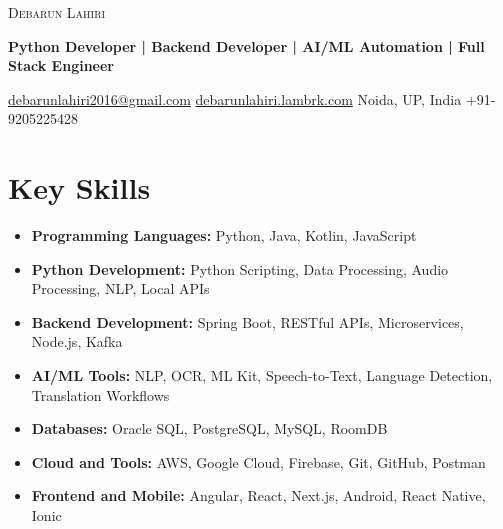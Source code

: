 \documentclass[10pt, a4paper]{article}
\begin{document}
\small

\begin{center}
    {\Huge \scshape Debarun Lahiri}
    \vspace{0.5ex}

    \textbf{Python Developer | Backend Developer | AI/ML Automation | Full Stack Engineer}
    \vspace{0.8ex}

    \href{mailto:debarunlahiri2016@gmail.com}{debarunlahiri2016@gmail.com} \quad\textbar\quad
    \href{https://debarunlahiri-web.vercel.app/}{debarunlahiri.lambrk.com} \quad\textbar\quad
    Noida, UP, India \quad\textbar\quad
    +91-9205225428
\end{center}

\section*{Key Skills}
\begin{itemize}[leftmargin=*, label={}, itemsep=0.2ex]
    \item \textbf{Programming Languages:} Python, Java, Kotlin, JavaScript
    \item \textbf{Python Development:} Python Scripting, Data Processing, Audio Processing, NLP, Local APIs
    \item \textbf{Backend Development:} Spring Boot, RESTful APIs, Microservices, Node.js, Kafka
    \item \textbf{AI/ML Tools:} NLP, OCR, ML Kit, Speech-to-Text, Language Detection, Translation Workflows
    \item \textbf{Databases:} Oracle SQL, PostgreSQL, MySQL, RoomDB
    \item \textbf{Cloud and Tools:} AWS, Google Cloud, Firebase, Git, GitHub, Postman
    \item \textbf{Frontend and Mobile:} Angular, React, Next.js, Android, React Native, Ionic
\end{itemize}

\end{document}
